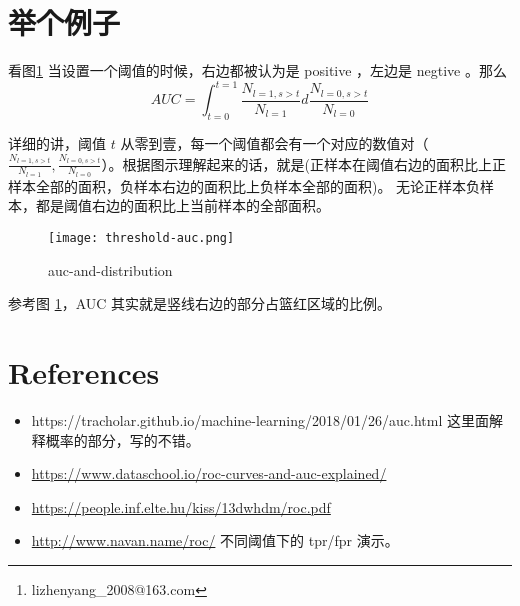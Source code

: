 \documentclass{article}
\author{Li Zhenyang\thanks{lizhenyang\_2008@163.com}}
\date{November 2019}
\begin{document}
   \maketitle
   \section{举个例子}
    看图\ref{auc-and-distribution} 当设置一个阈值的时候，右边都被认为是 positive ，左边是 negtive 。那么 
    $$
    AUC = \int_{t=0}^{t=1} \frac{N_{l=1, s > t}}{N_{l=1}} d\frac{N_{l=0, s > t}}{N_{l=0}}
    $$

    详细的讲，阈值 $t$ 从零到壹，每一个阈值都会有一个对应的数值对（$\frac{N_{l=1, s > t}}{N_{l=1}}, \frac{N_{l=0, s > t}}{N_{l=0}}$）。根据图示理解起来的话，就是(正样本在阈值右边的面积比上正样本全部的面积，负样本右边的面积比上负样本全部的面积)。
    无论正样本负样本，都是阈值右边的面积比上当前样本的全部面积。

\begin{comment}
   \section{AUC 是什么？}
   \section{计算代码}
   \section{一些思考}
   根据 [模型评估指标AUC（area under the curve）](https://blog.csdn.net/liweibin1994/article/details/79462554) 这个文章里面的一个图，AUC 可以被认为是正负样本分布的重合程度。重合程度越高，AUC 越大。当正负样本分布较接近时，AUC 接近 0.5。
\end{comment}
   \begin{figure}[h]
       \texttt{[image: threshold-auc.png]}
       \caption{auc-and-distribution}
       \label{auc-and-distribution}
   \end{figure}


   参考图 \ref{auc-and-distribution}，AUC 其实就是竖线右边的部分占篮红区域的比例。

    \section{References} 
        \begin{itemize}
            \item https://tracholar.github.io/machine-learning/2018/01/26/auc.html 这里面解释概率的部分，写的不错。
             \item \url{https://www.dataschool.io/roc-curves-and-auc-explained/}
             \item \url{https://people.inf.elte.hu/kiss/13dwhdm/roc.pdf}
             \item \url{http://www.navan.name/roc/} 不同阈值下的 tpr/fpr 演示。
        \end{itemize}
\end{document}

